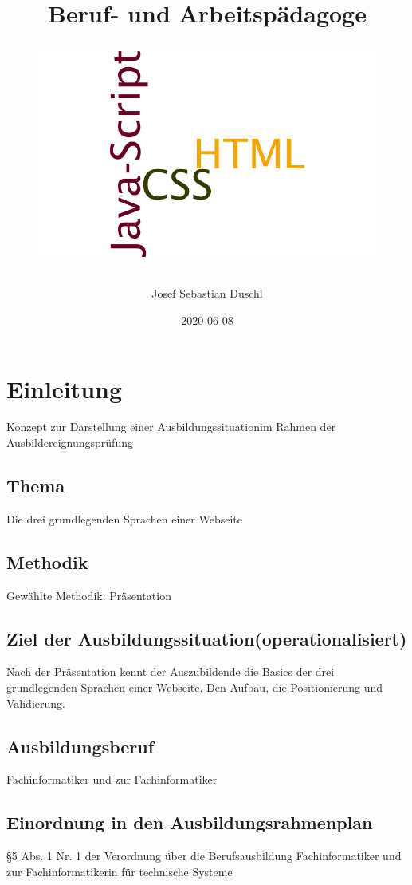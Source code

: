 \documentclass{article}
\title{
	Beruf- und Arbeitspädagoge\\
	 \thema
	\newline
	\begin{figure}[h!]
		\vspace{15mm}
	\includegraphics[scale=0.2, width=\linewidth]{./pics/htmlCssJsWordwordle.png}
\end{figure}
	\vfill
}
\author{
	Josef Sebastian Duschl
}
\date{2020-06-08}
\newcommand{\thema}{Die drei grundlegenden Sprachen einer Webseite}
\begin{document}


    \maketitle
    \newpage

    \tableofcontents %
    \newpage

	\section{Einleitung}
	Konzept zur Darstellung einer Ausbildungssituationim Rahmen der Ausbildereignungsprüfung
	\subsection{Thema}
	\thema

    \subsection{Methodik}
        Gewählte Methodik: Präsentation
     
    \subsection{Ziel der Ausbildungssituation(operationalisiert)}     
        Nach der Präsentation kennt der Auszubildende die Basics der drei grundlegenden Sprachen einer Webseite. Den Aufbau, die Positionierung und Validierung.
        
    \subsection{Ausbildungsberuf}
    Fachinformatiker und zur Fachinformatiker
    
    \subsection{Einordnung in den Ausbildungsrahmenplan}
    §5 Abs. 1 Nr. 1 der Verordnung über die Berufsausbildung  Fachinformatiker und zur Fachinformatikerin für technische Systeme
    
\end{document}
